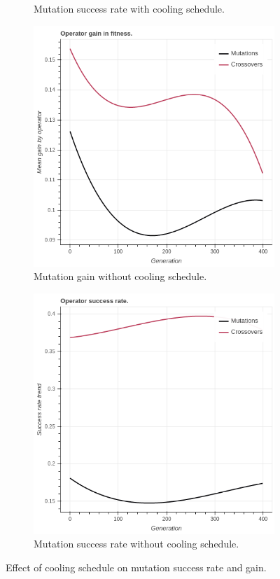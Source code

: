 \begin{figure}
\begin{subfigure}{0.6\textwidth}
        \caption{Mutation success rate with cooling schedule.}
    \end{subfigure}
        \begin{subfigure}{0.6\textwidth}
    \centering
        \includegraphics[width=0.8\linewidth]{figures/noncoolinggain.png}
        \caption{Mutation gain without cooling schedule.}
    \end{subfigure}%
    \begin{subfigure}{0.6\textwidth}
    \centering
        \includegraphics[width=0.8\linewidth]{figures/noncoolingrate.png}
        \caption{Mutation success rate without cooling schedule.}
    \end{subfigure}
    \caption{Effect of cooling schedule on mutation success rate and gain.}
    \label{fig:cooling}
    \end{figure}
